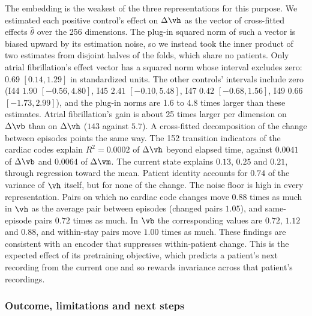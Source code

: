 The embedding is the weakest of the three representations for this purpose. We estimated each positive control's effect on $\Delta\vh$ as the vector of cross-fitted effects $\hat\theta$ over the 256 dimensions. The plug-in squared norm of such a vector is biased upward by its estimation noise, so we instead took the inner product of two estimates from disjoint halves of the folds, which share no patients. Only atrial fibrillation's effect vector has a squared norm whose interval excludes zero: $0.69$ $[0.14, 1.29]$ in standardized units. The other controls' intervals include zero (I44 $1.90$ $[-0.56, 4.80]$, I45 $2.41$ $[-0.10, 5.48]$, I47 $0.42$ $[-0.68, 1.56]$, I49 $0.66$ $[-1.73, 2.99]$), and the plug-in norms are 1.6 to 4.8 times larger than these estimates. Atrial fibrillation's gain is about 25 times larger per dimension on $\Delta\vb$ than on $\Delta\vh$ ($143$ against $5.7$). A cross-fitted decomposition of the change between episodes points the same way. The 152 transition indicators of the cardiac codes explain $R^2=0.0002$ of $\Delta\vh$ beyond elapsed time, against $0.0041$ of $\Delta\vb$ and $0.0064$ of $\Delta\vm$. The current state explains $0.13$, $0.25$ and $0.21$, through regression toward the mean. Patient identity accounts for $0.74$ of the variance of $\vh$ itself, but for none of the change. The noise floor is high in every representation. Pairs on which no cardiac code changes move $0.88$ times as much in $\vh$ as the average pair between episodes (changed pairs $1.05$), and same-episode pairs $0.72$ times as much. In $\vb$ the corresponding values are $0.72$, $1.12$ and $0.88$, and within-stay pairs move $1.00$ times as much. These findings are consistent with an encoder that suppresses within-patient change. This is the expected effect of its pretraining objective, which predicts a patient's next recording from the current one and so rewards invariance across that patient's recordings.

\subsubsection{Outcome, limitations and next steps}
\label{sec:gonogo-decision}

